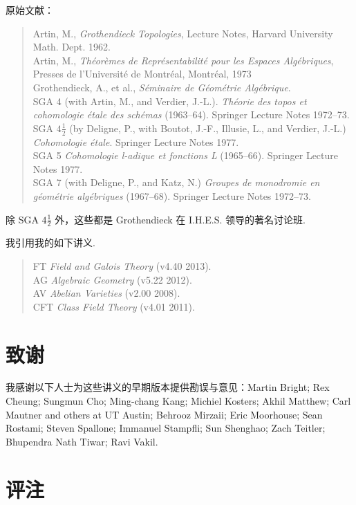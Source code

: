 原始文献：
\begin{quote}
  Artin, M., \emph{Grothendieck Topologies}, Lecture Notes, Harvard University Math. Dept. 1962.\\
  Artin, M., \emph{Th\'eor\`emes de Repr\'esentabilit\'e pour les Espaces Alg\'ebriques}, Presses de l'Universit\'e de Montr\'eal, Montr\'eal, 1973\\
  Grothendieck, A., et al., \emph{S\'eminaire de G\'eom\'etrie Alg\'ebrique}.\\
  SGA 4 (with Artin, M., and Verdier, J.-L.). \emph{Th\'eorie des topos et cohomologie \'etale des sch\'emas} (1963--64). Springer Lecture Notes 1972--73.\\
  SGA $4\frac{1}{2}$ (by Deligne, P., with Boutot, J.-F., Illusie, L., and Verdier, J.-L.) \emph{Cohomologie \'etale}. Springer Lecture Notes 1977.\\
  SGA 5 \emph{Cohomologie l-adique et fonctions L} (1965--66). Springer Lecture Notes 1977.\\
  SGA 7 (with Deligne, P., and Katz, N.) \emph{Groupes de monodromie en g\'eom\'etrie alg\'ebriques} (1967--68). Springer Lecture Notes 1972--73.
\end{quote}

除 SGA $4\frac{1}{2}$ 外，这些都是 Grothendieck 在 I.H.E.S. 领导的著名讨论班.

我引用我的如下讲义.
\begin{quote}
  FT \emph{Field and Galois Theory} (v4.40 2013).\\
  AG \emph{Algebraic Geometry} (v5.22 2012).\\
  AV \emph{Abelian Varieties} (v2.00 2008).\\
  CFT \emph{Class Field Theory} (v4.01 2011).
\end{quote}

\chapter*{致谢}

我感谢以下人士为这些讲义的早期版本提供勘误与意见：Martin Bright; Rex Cheung; Sungmun Cho; Ming-chang Kang; Michiel Kosters; Akhil Matthew; Carl Mautner and others at UT Austin; Behrooz Mirzaii; Eric Moorhouse; Sean Rostami; Steven Spallone; Immanuel Stampfli; Sun Shenghao; Zach Teitler; Bhupendra Nath Tiwar; Ravi Vakil.

\chapter*{评注}

